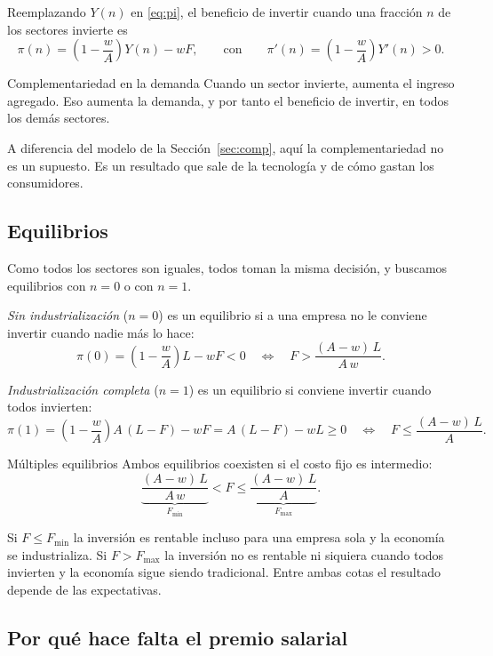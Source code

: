 \documentclass[12pt,letterpaper]{article}
\begin{document}
Reemplazando $Y(n)$ en \eqref{eq:pi}, el beneficio de invertir cuando una fracción $n$ de los sectores invierte es
\[
  \pi(n)=\left(1-\frac{w}{A}\right)Y(n)-wF,
  \qquad\text{con}\qquad
  \pi'(n)=\left(1-\frac{w}{A}\right)Y'(n)>0 .
\]

\begin{resultado}{Complementariedad en la demanda}
Cuando un sector invierte, aumenta el ingreso agregado. Eso aumenta la demanda, y por tanto el beneficio de invertir, en todos los demás sectores.
\end{resultado}

A diferencia del modelo de la Sección~\ref{sec:comp}, aquí la complementariedad no es un supuesto. Es un resultado que sale de la tecnología y de cómo gastan los consumidores.

\subsection{Equilibrios}

Como todos los sectores son iguales, todos toman la misma decisión, y buscamos equilibrios con $n=0$ o con $n=1$.

\emph{Sin industrialización} ($n=0$) es un equilibrio si a una empresa no le conviene invertir cuando nadie más lo hace:
\[
  \pi(0)=\left(1-\frac{w}{A}\right)L-wF<0
  \quad\Longleftrightarrow\quad
  F>\frac{(A-w)\,L}{A\,w}.
\]

\emph{Industrialización completa} ($n=1$) es un equilibrio si conviene invertir cuando todos invierten:
\[
  \pi(1)=\left(1-\frac{w}{A}\right)A\,(L-F)-wF=A\,(L-F)-wL\geq0
  \quad\Longleftrightarrow\quad
  F\leq\frac{(A-w)\,L}{A}.
\]

\begin{resultado}{Múltiples equilibrios}
Ambos equilibrios coexisten si el costo fijo es intermedio:
\[
  \underbrace{\frac{(A-w)\,L}{A\,w}}_{F_{\min}}<F\leq\underbrace{\frac{(A-w)\,L}{A}}_{F_{\max}} .
\]
\end{resultado}

\noindent Si $F\leq F_{\min}$ la inversión es rentable incluso para una empresa sola y la economía se industrializa. Si $F>F_{\max}$ la inversión no es rentable ni siquiera cuando todos invierten y la economía sigue siendo tradicional. Entre ambas cotas el resultado depende de las expectativas.

\subsection{Por qué hace falta el premio salarial}
\end{document}
